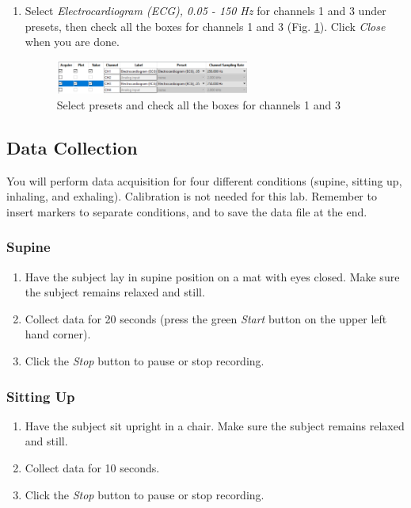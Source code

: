 \documentclass{article}
\begin{document}
\begin{enumerate}
	\item Select \textit{Electrocardiogram (ECG), 0.05 - 150 Hz} for channels 1 and 3 under presets, then check all the boxes for channels 1 and 3 (Fig. \ref{boxes}). Click \textit{Close} when you are done.
		\begin{figure}[h]
	\centering\includegraphics[width=0.6\textwidth]{../images/ECG_II_8.png}
		\caption{Select presets and check all the boxes for channels 1 and 3}
		\label{boxes}
		\end{figure}
\end{enumerate}

\subsection*{Data Collection}
You will perform data acquisition for four different conditions (supine, sitting up, inhaling, and exhaling). Calibration is not needed for this lab. Remember to insert markers to separate conditions, and to save the data file at the end.
\subsubsection*{Supine}
\begin{enumerate}
	\item Have the subject lay in supine position on a mat with eyes closed. Make sure the subject remains relaxed and still.
	\item Collect data for 20 seconds (press the green \textit{Start} button on the upper left hand corner).
	\item Click the \textit{Stop} button to pause or stop recording.
\end{enumerate}

\subsubsection*{Sitting Up}
\begin{enumerate}
	\item Have the subject sit upright in a chair. Make sure the subject remains relaxed and still.
	\item Collect data for 10 seconds.
	\item Click the \textit{Stop} button to pause or stop recording.
\end{enumerate}
\end{document}
